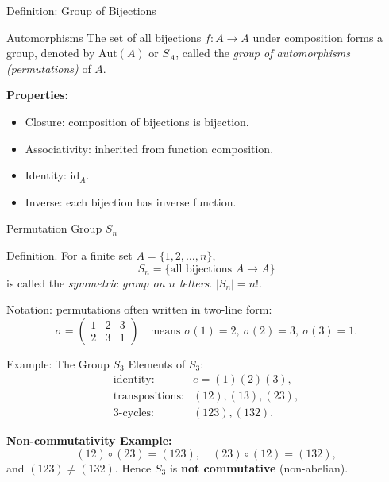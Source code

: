 \documentclass[11pt,aspectratio=43,ignorenonframetext,t]{beamer}
\begin{document}
\begin{frame}{Definition: Group of Bijections}
\begin{block}{Automorphisms}
    The set of all bijections \(f:A\to A\) under composition forms a group,  
denoted by \(\mathrm{Aut}(A)\) or \(S_A\), called the \emph{group of automorphisms (permutations)} of \(A\).

\textbf{Properties:}
\begin{itemize}
  \item Closure: composition of bijections is bijection.
  \item Associativity: inherited from function composition.
  \item Identity: \(\mathrm{id}_A\).
  \item Inverse: each bijection has inverse function.
\end{itemize}
\end{block}
\end{frame}

\begin{frame}{Permutation Group \(S_n\)}
\begin{block}{Definition.}
For a finite set \(A=\{1,2,\dots,n\}\),
\[
S_n = \{ \text{all bijections } A \to A \}
\]
is called the \emph{symmetric group on $n$ letters}.  
\(|S_n| = n!\).
\end{block}

\begin{block}{Notation:} permutations often written in two-line form:
\[
\sigma = \begin{pmatrix}
1 & 2 & 3 \\
2 & 3 & 1
\end{pmatrix}
\quad \text{means } \sigma(1)=2,\ \sigma(2)=3,\ \sigma(3)=1.
\]
\end{block}
\end{frame}

\begin{frame}{Example: The Group \(S_3\)}
Elements of \(S_3\):
\[
\begin{array}{lcl}
\text{identity:} & e = (1)(2)(3), \\
\text{transpositions:} & (12), (13), (23),\\
\text{3-cycles:} & (123), (132).
\end{array}
\]

\textbf{Non-commutativity Example:}
\[
(12)\circ(23) = (123), \quad (23)\circ(12) = (132),
\]
and \((123) \ne (132)\).  
Hence \(S_3\) is \textbf{not commutative} (non-abelian).

\begin{center}
\end{center}
\end{frame}
\end{document}
